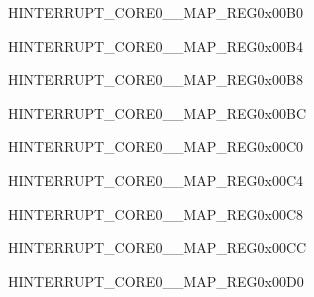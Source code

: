 \begin{register}{H}{INTERRUPT\_CORE0\_\_MAP\_REG}{0x00B0}\label{regdesc:INTERRUPTCORE0SPI2DMAINTMAPREG}
\end{register}
\vspace{-3em}

\begin{register}{H}{INTERRUPT\_CORE0\_\_MAP\_REG}{0x00B4}\label{regdesc:INTERRUPTCORE0SPI3DMAINTMAPREG}
\end{register}
\vspace{-3em}

\begin{register}{H}{INTERRUPT\_CORE0\_\_MAP\_REG}{0x00B8}\label{regdesc:INTERRUPTCORE0SPI4DMAINTMAPREG}
\end{register}
\vspace{-3em}

\begin{register}{H}{INTERRUPT\_CORE0\_\_MAP\_REG}{0x00BC}\label{regdesc:INTERRUPTCORE0WDGINTMAPREG}
\end{register}
\vspace{-3em}

\begin{register}{H}{INTERRUPT\_CORE0\_\_MAP\_REG}{0x00C0}\label{regdesc:INTERRUPTCORE0TIMERINT1MAPREG}
\end{register}
\vspace{-3em}

\begin{register}{H}{INTERRUPT\_CORE0\_\_MAP\_REG}{0x00C4}\label{regdesc:INTERRUPTCORE0TIMERINT2MAPREG}
\end{register}
\vspace{-3em}

\begin{register}{H}{INTERRUPT\_CORE0\_\_MAP\_REG}{0x00C8}\label{regdesc:INTERRUPTCORE0TGT0INTMAPREG}
\end{register}
\vspace{-3em}

\begin{register}{H}{INTERRUPT\_CORE0\_\_MAP\_REG}{0x00CC}\label{regdesc:INTERRUPTCORE0TGT1INTMAPREG}
\end{register}
\vspace{-3em}

\begin{register}{H}{INTERRUPT\_CORE0\_\_MAP\_REG}{0x00D0}\label{regdesc:INTERRUPTCORE0TGWDTINTMAPREG}
\end{register}
\vspace{-3em}

